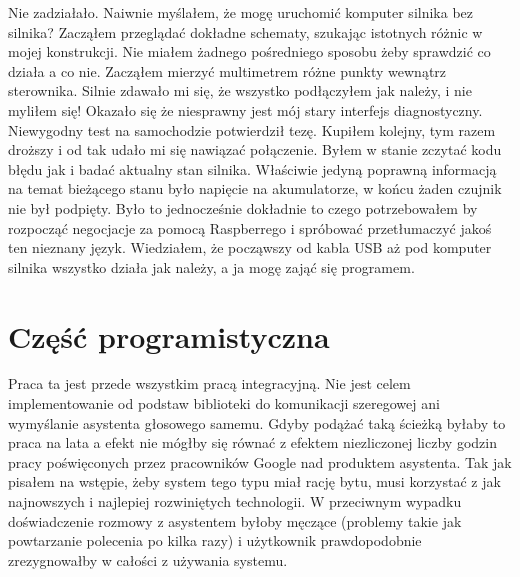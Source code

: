 \documentclass[declaration,shortabstract, inz]{iithesis}
\begin{document}
    Nie zadziałało. Naiwnie myślałem, że mogę uruchomić komputer silnika bez silnika? Zacząłem przeglądać dokładne schematy, szukając istotnych różnic w mojej konstrukcji. Nie miałem żadnego pośredniego sposobu żeby sprawdzić co działa a co nie. Zacząłem mierzyć multimetrem różne punkty wewnątrz sterownika. Silnie zdawało mi się, że wszystko podłączyłem jak należy, i nie myliłem się! Okazało się że niesprawny jest mój stary interfejs diagnostyczny. Niewygodny test na samochodzie potwierdził tezę. Kupiłem kolejny, tym razem droższy i od tak udało mi się nawiązać połączenie. Byłem w stanie zczytać kodu błędu jak i badać aktualny stan silnika. Właściwie jedyną poprawną informacją na temat bieżącego stanu było napięcie na akumulatorze, w końcu żaden czujnik nie był podpięty. Było to jednocześnie dokładnie to czego potrzebowałem by rozpocząć negocjacje za pomocą Raspberrego i spróbować przetłumaczyć jakoś ten nieznany język. Wiedziałem, że począwszy od kabla USB aż pod komputer silnika wszystko działa jak należy, a ja mogę zająć się programem.

\section{Część programistyczna}
    Praca ta jest przede wszystkim pracą integracyjną. Nie jest celem implementowanie od podstaw biblioteki do komunikacji szeregowej ani wymyślanie asystenta głosowego samemu. Gdyby podążać taką ścieżką byłaby to praca na lata a efekt nie mógłby się równać z efektem niezliczonej liczby godzin pracy poświęconych przez pracowników Google nad produktem asystenta. Tak jak pisałem na wstępie, żeby system tego typu miał rację bytu, musi korzystać z jak najnowszych i najlepiej rozwiniętych technologii. W przeciwnym wypadku doświadczenie rozmowy z asystentem byłoby męczące (problemy takie jak powtarzanie polecenia po kilka razy) i użytkownik prawdopodobnie zrezygnowałby w całości z używania systemu. 
    
\end{document}
